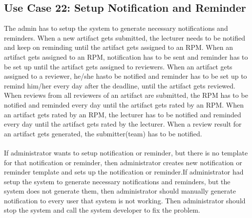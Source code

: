     \subsection*{Use Case 22: Setup Notification and Reminder }
    The admin has to setup the system to generate necessary notifications and reminders. When a new artifact gets submitted, the lecturer needs to be notified and keep on reminding until the artifact gets assigned to an RPM. When an artifact gets assigned to an RPM, notification has to be sent and reminder has to be set up until the artifact gets assigned to reviewers. When an artifact gets assigned to a reviewer, he/she hasto be notified and reminder has to be set up to remind him/her every day after the deadline, until the artifact gets reviewed. When reviews from all reviewers of an artifact are submitted, the RPM has to be notified and reminded every day until the artifact gets rated by an RPM. When an artifact gets rated by an RPM, the lecturer has to be notified and reminded every day until the artifact gets rated by the lecturer. When a review result for an artifact gets generated, the submitter(team) has to be notified.
    \\
    \\
    If administrator wants to setup notification or reminder, but there is no template for that notification or reminder, then administrator creates new notification or reminder template and sets up the notification or reminder.If administrator had setup the system to generate necessary notifications and reminders, but the system does not generate them, then administrator should manually generate notification to every user that system is not working. Then administrator should stop the system and call the system developer to fix the problem.
    
    
  \newpage
  
  
